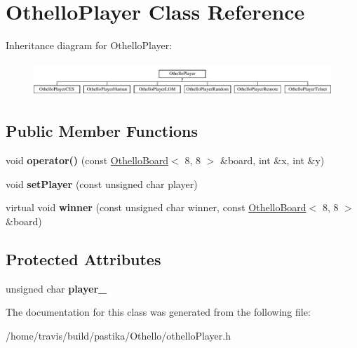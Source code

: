 \hypertarget{classOthelloPlayer}{\section{Othello\-Player Class Reference}
\label{classOthelloPlayer}
}
Inheritance diagram for Othello\-Player\-:\begin{figure}[H]
\begin{center}
\leavevmode
\includegraphics[height=1.314554cm]{classOthelloPlayer}
\end{center}
\end{figure}
\subsection*{Public Member Functions}
\begin{DoxyCompactItemize}
\item 
\hypertarget{classOthelloPlayer_a9aa0f48e9cb6c1e7c9037850423f2915}{void {\bfseries operator()} (const \hyperlink{classOthelloBoard}{Othello\-Board}$<$ 8, 8 $>$ \&board, int \&x, int \&y)}\label{classOthelloPlayer_a9aa0f48e9cb6c1e7c9037850423f2915}

\item 
\hypertarget{classOthelloPlayer_a856fb93347be5480c9db179bb912c694}{void {\bfseries set\-Player} (const unsigned char player)}\label{classOthelloPlayer_a856fb93347be5480c9db179bb912c694}

\item 
\hypertarget{classOthelloPlayer_a278b0f93b676c302f914a3dac85d5adf}{virtual void {\bfseries winner} (const unsigned char winner, const \hyperlink{classOthelloBoard}{Othello\-Board}$<$ 8, 8 $>$ \&board)}\label{classOthelloPlayer_a278b0f93b676c302f914a3dac85d5adf}

\end{DoxyCompactItemize}
\subsection*{Protected Attributes}
\begin{DoxyCompactItemize}
\item 
\hypertarget{classOthelloPlayer_a19f59ab327765eac668851590e7d51f3}{unsigned char {\bfseries player\-\_\-}}\label{classOthelloPlayer_a19f59ab327765eac668851590e7d51f3}

\end{DoxyCompactItemize}


The documentation for this class was generated from the following file\-:\begin{DoxyCompactItemize}
\item 
/home/travis/build/pastika/\-Othello/othello\-Player.\-h\end{DoxyCompactItemize}
